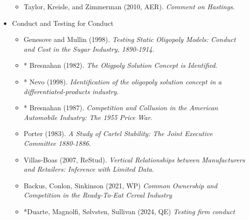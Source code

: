 \documentclass[11pt]{article}
\begin{document}
\begin{itemize}
\begin{itemize}
\item Taylor, Kreisle, and Zimmerman (2010, AER). \textit{Comment on Hastings}.
\end{itemize}
\item Conduct and Testing for Conduct
\begin{itemize}
\item Genesove and Mullin (1998). \textit{Testing Static Oligopoly Models: Conduct and Cost in the Sugar Industry, 1890-1914}.
\item * Bresnahan (1982). \textit{The Oligpoly Solution Concept is Identified}.
\item * Nevo (1998). \textit{Identification of the oligopoly solution concept in a differentiated-products industry}.
\item * Bresnahan (1987). \textit{Competition and Collusion in the American Automobile Industry: The 1955 Price War}.
\item Porter (1983). \textit{A Study of Cartel Stability: The Joint Executive Committee 1880-1886}.
\item Villas-Boas (2007, ReStud). \textit{Vertical Relationships between Manufacturers and Retailers: Inference with Limited Data}.
\item Backus, Conlon, Sinkinson (2021, WP) \textit{Common Ownership and Competition in the Ready-To-Eat Cereal Industry}
\item *Duarte, Magnolfi, Sølvsten, Sullivan (2024, QE) \textit{Testing firm conduct}
\end{itemize}
\end{itemize}
\end{document}

